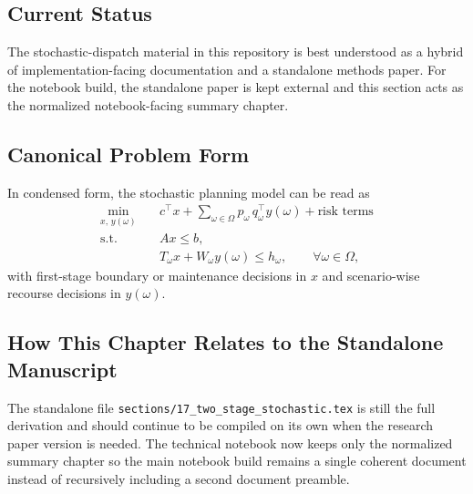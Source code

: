 \subsection{Current Status}

The stochastic-dispatch material in this repository is best understood as a
hybrid of implementation-facing documentation and a standalone methods paper.
For the notebook build, the standalone paper is kept external and this section
acts as the normalized notebook-facing summary chapter.

\subsection{Canonical Problem Form}

In condensed form, the stochastic planning model can be read as
\begin{align}
\min_{x,\,y(\omega)} \quad & c^\top x + \sum_{\omega\in\Omega} p_\omega\, q_\omega^\top y(\omega) + \text{risk terms} \\
\text{s.t.}\quad & A x \le b, \\
& T_\omega x + W_\omega y(\omega) \le h_\omega, \qquad \forall \omega\in\Omega,
\end{align}
with first-stage boundary or maintenance decisions in \(x\) and scenario-wise
recourse decisions in \(y(\omega)\).

\subsection{How This Chapter Relates to the Standalone Manuscript}

The standalone file \texttt{sections/17\_two\_stage\_stochastic.tex} is still the
full derivation and should continue to be compiled on its own when the research
paper version is needed.  The technical notebook now keeps only the normalized
summary chapter so the main notebook build remains a single coherent document
instead of recursively including a second document preamble.